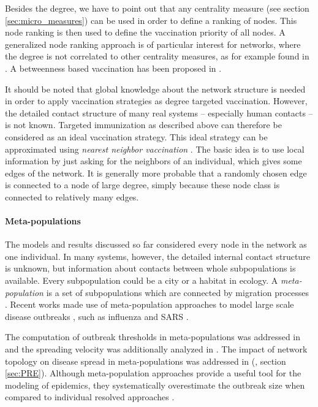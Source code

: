 Besides the degree, we have to point out that any centrality measure (see section \ref{sec:micro_measures}) can be used in order to define a ranking of nodes.
This node ranking is then used to define the vaccination priority of all nodes.
A generalized node ranking approach is of particular interest for networks, where the degree is not correlated to other centrality measures, as for example found in \citep{Guimera:2005p5232}.
A betweenness based vaccination has been proposed in \citep{holme:2002}.

It should be noted that global knowledge about the network structure is needed in order to apply vaccination strategies as degree targeted vaccination.
However, the detailed contact structure of many real systems -- especially human contacts -- is not known.
Targeted immunization as described above can therefore be considered as an ideal vaccination strategy.
This ideal strategy can be approximated using \emph{nearest neighbor vaccination} \citep{Cohen:PRL}.
The basic idea is to use local information by just asking for the neighbors of an individual, which gives some edges of the network.
It is generally more probable that a randomly chosen edge is connected to a node of large degree, simply because these node class is connected to relatively many edges.

\paragraph{Meta-populations\color{Cayenne}{.}}
The models and results discussed so far considered every node in the network as one individual.
In many systems, however, the detailed internal contact structure is unknown, but information about contacts between whole subpopulations is available.
Every subpopulation could be a city or a habitat in ecology. 
A \emph{meta-population} is a set of subpopulations which are connected by migration processes \citep{dynamical_processes,Hanski:1998,Grenfell:1997ts}.
Recent works made use of meta-population approaches to model large scale disease outbreaks \citep{VittoriaColizza02142006}, such as influenza \citep{DuyguBalcan12222009} and SARS \citep{Hufnagel:2004p27}.

The computation of outbreak thresholds in meta-populations was addressed in \citep{Colizza:2007p6276,Colizza:2007p5906} and the spreading velocity was additionally analyzed in \citep{Belik:2011ke}.
The impact of network topology on disease spread in meta-populations was addressed in (\citet{Lentz:2012pre}, section \ref{sec:PRE}).
Although meta-population approaches provide a useful tool for the modeling of epidemics, they systematically overestimate the outbreak size when compared to individual resolved approaches \citep{Keeling11052010}.

